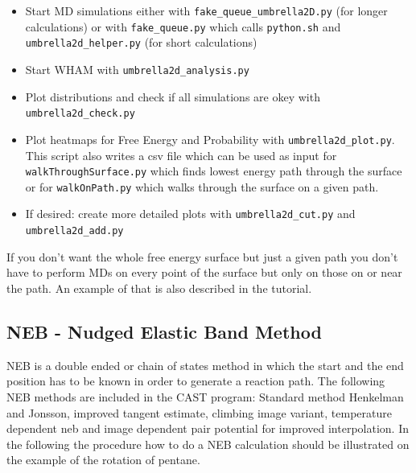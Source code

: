\documentclass[10pt,a4paper]{article} %
\begin{document}
	\begin{itemize}
		\item Start MD simulations either with \texttt{fake\_queue\_umbrella2D.py} (for longer calculations) or with \texttt{fake\_queue.py} which calls \texttt{python.sh} and \texttt{umbrella2d\_helper.py} (for short calculations)
		\item Start WHAM with \texttt{umbrella2d\_analysis.py}
		\item Plot distributions and check if all simulations are okey with \texttt{umbrella2d\_check.py}
		\item Plot heatmaps for Free Energy and Probability with \texttt{umbrella2d\_plot.py}. This script also writes a csv file which can be used as input for \texttt{walkThroughSurface.py} which finds lowest energy path through the surface or for \texttt{walkOnPath.py} which walks through the surface on a given path.
		\item If desired: create more detailed plots with \texttt{umbrella2d\_cut.py} and \texttt{umbrella2d\_add.py}
	\end{itemize}

    If you don't want the whole free energy surface but just a given path you don't have to perform MDs on every point of the surface but only on those on or near the path. An example of that is also described in the tutorial.

	\subsection{NEB - Nudged Elastic Band Method}	
NEB is a double ended or chain of states method in which the start and the end position has to be known in order to generate a reaction path. 
The following NEB methods are included in the CAST program: Standard method Henkelman and Jonsson\supercite{JonssonH.1998}, improved tangent estimate\supercite{Henkelman2000}, climbing image variant\supercite{Henkelman2000a}, temperature dependent neb\supercite{Crehuet2003} and image dependent pair potential for improved interpolation\supercite{Smidstrup2014}.
In the following the procedure how to do a NEB calculation should be illustrated on the example of the rotation of pentane.\newline
\end{document}
